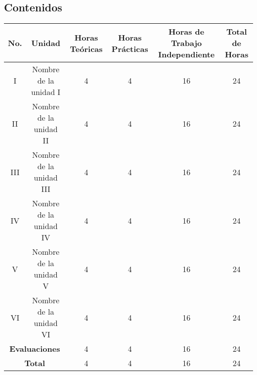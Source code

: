 \begin{landscape}
    \section{Contenidos}

    \begin{doublespace}
        \begin{adjustbox}{width=1.3847\textwidth}
            \begin{tabular}{ | c | c | c | c | c | c | }
                \hline
                \textbf{No.}                                & \textbf{Unidad}         & \textbf{Horas Teóricas} & \textbf{Horas Prácticas} & \textbf{Horas de Trabajo Independiente} & \textbf{Total de Horas} \\
                \hline
                I                                           & Nombre de la unidad I   & 4                       & 4                        & 16                                      & 24                      \\
                \hline
                II                                          & Nombre de la unidad II  & 4                       & 4                        & 16                                      & 24                      \\
                \hline
                III                                         & Nombre de la unidad III & 4                       & 4                        & 16                                      & 24                      \\
                \hline
                IV                                          & Nombre de la unidad IV  & 4                       & 4                        & 16                                      & 24                      \\
                \hline
                V                                           & Nombre de la unidad V   & 4                       & 4                        & 16                                      & 24                      \\
                \hline
                VI                                          & Nombre de la unidad VI  & 4                       & 4                        & 16                                      & 24                      \\
                \hline
                \multicolumn{2}{|c|}{\textbf{Evaluaciones}} & 4                       & 4                       & 16                       & 24                                                                \\
                \hline
                \multicolumn{2}{|c|}{\textbf{Total}}        & 4                       & 4                       & 16                       & 24                                                                \\
                \hline
            \end{tabular}
        \end{adjustbox}
    \end{doublespace}
\end{landscape}
\pagebreak